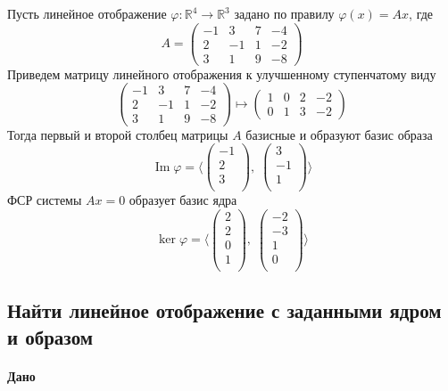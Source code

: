 \documentclass{article}
\renewcommand{\Im}{\operatorname{Im}}
\begin{document}
Пусть линейное отображение $\varphi \colon \mathbb R^4\to \mathbb R^3$ задано по правилу $\varphi(x) = Ax$, где
\[
A =
\begin{pmatrix}
-1&3&7&-4\\
2&-1&1&-2\\
3&1&9&-8
\end{pmatrix}
\]
Приведем матрицу линейного отображения к улучшенному ступенчатому виду
\[
\begin{pmatrix}
-1&3&7&-4\\
2&-1&1&-2\\
3&1&9&-8
\end{pmatrix}
\mapsto
\begin{pmatrix}
1&0&2&-2\\
0&1&3&-2
\end{pmatrix}
\]
Тогда первый и второй столбец матрицы $A$ базисные и образуют базис образа
\[
\Im \varphi =
\langle
\begin{pmatrix}
{-1}\\
{2}\\
{3}\\
\end{pmatrix},\;\begin{pmatrix}
{3}\\
{-1}\\
{1}\\
\end{pmatrix}
\rangle
\]
ФСР системы $Ax = 0$ образует базис ядра
\[
\ker \varphi =
\langle
\begin{pmatrix}
{2}\\
{2}\\
{0}\\
{1}\\
\end{pmatrix},\;\begin{pmatrix}
{-2}\\
{-3}\\
{1}\\
{0}\\
\end{pmatrix}
\rangle
\]

\subsection{Найти линейное отображение с заданными ядром и образом}

\paragraph{Дано}
\end{document}
